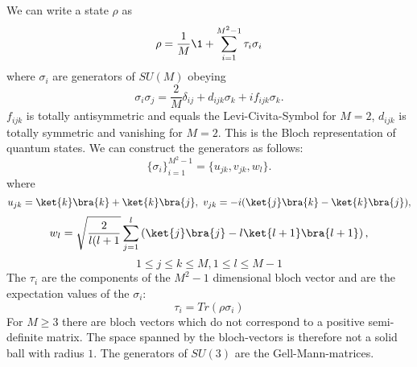 We can write a state $\rho$ as
$$\rho = \frac{1}{M} \1 + \sum_{i=1}^{M^2-1} \tau_i \sigma_i$$
where $\sigma_i$ are generators of $SU(M)$ obeying
\[
	\sigma_i\sigma_j = \frac{2}{M}\delta_{ij} + d_{ijk}\sigma_k + if_{ijk}\sigma_k
.\]
$f_{ijk}$ is totally antisymmetric and equals the Levi-Civita-Symbol for $M=2$, $d_{ijk}$ is totally symmetric and vanishing for $M=2$.
This is the Bloch representation of quantum states.
We can construct the generators as follows:\cite{kimura03}
 \[
\{\sigma_i\}^{M^2-1}_{i=1} = \{u_{jk},v_{jk},w_l\}
.\]
where
$$
	u_{jk} = \ket{k}\bra{k}+\ket{k}\bra{j}, ~ v_{jk} = -i(\ket{j}\bra{k}-\ket{k}\bra{j}),
$$
$$
	w_l = \sqrt{\frac{2}{l(l+1}} \sum_{j=1}^{l} \left( \ket{j}\bra{j}-l\ket{l+1}\bra{l+1} \right),$$
	$$ 1\le j\le k\le M, 1\le l\le M-1$$
The $\tau_i$ are the components of the $M^2-1$ dimensional bloch vector and are the expectation values of the $\sigma_i$:
$$
	 \tau_i = Tr(\rho\sigma_i)
$$
For $M\ge3$ there are bloch vectors which do not correspond to a positive semi-definite matrix.
The space spanned by the bloch-vectors is therefore not a solid ball with radius $1$.
The generators of  $SU(3)$ are the Gell-Mann-matrices.  \\
